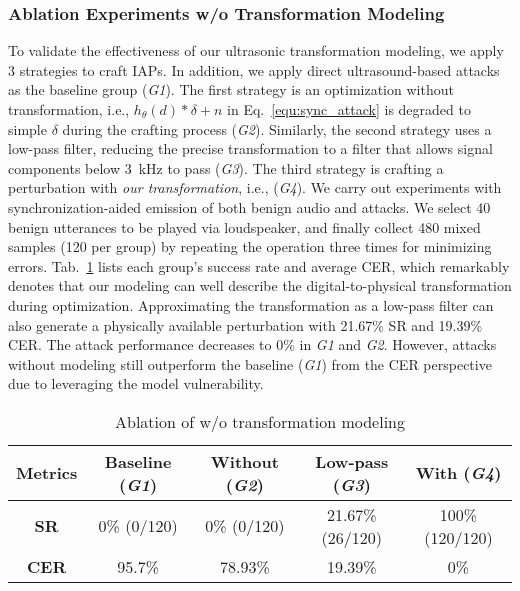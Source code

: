 \subsubsection{Ablation Experiments w/o Transformation Modeling}\label{sec:eval_utm}
To validate the effectiveness of our ultrasonic transformation modeling, we apply 3 strategies to craft IAPs. In addition, we apply direct ultrasound-based attacks as the baseline group (\textit{G1}).
The first strategy is an optimization without transformation, i.e., $h_{\theta}(d)\ast\delta+n$ in Eq.~\ref{equ:sync_attack} is degraded to simple $\delta$ during the crafting process (\textit{G2}). 
Similarly, the second strategy uses a low-pass filter, reducing the precise transformation to a filter that allows signal components below 3~kHz to pass (\textit{G3}).
The third strategy is crafting a perturbation with \emph{our transformation}, i.e., \alias (\textit{G4}). 
We carry out experiments with synchronization-aided emission of both benign audio and attacks. We select 40 benign utterances to be played via loudspeaker, and finally collect 480 mixed samples (120 per group) by repeating the operation three times for minimizing errors. Tab.~\ref{tab:wo_transformation} lists each group's success rate and average CER, which remarkably denotes that our modeling can well describe the digital-to-physical transformation during optimization. Approximating the transformation as a low-pass filter can also generate a physically available perturbation with 21.67\% SR and 19.39\% CER. The attack performance decreases to 0\% in \textit{G1} and \textit{G2}. However, attacks without modeling still outperform the baseline (\textit{G1}) from the CER perspective due to leveraging the model vulnerability.


\begin{table}[t]\footnotesize
	\centering
		\caption{Ablation of w/o transformation modeling}
		\renewcommand\arraystretch{0.7}
		\renewcommand\tabcolsep{2pt}
		\begin{threeparttable}
			\begin{tabular}{c|c|c|c|c}
				\toprule
				\textbf{Metrics} & \textbf{Baseline (\textit{G1})} & \textbf{Without (\textit{G2})} & \textbf{Low-pass (\textit{G3})} & \textbf{With (\textit{G4})} \\
				\midrule
				\textbf{SR} & 0\% (0/120) & 0\% (0/120) & 21.67\% (26/120) & 100\% (120/120) \\ \midrule
				\textbf{CER} & 95.7\% & 78.93\% & 19.39\% & 0\% \\
				\bottomrule
			\end{tabular}
		\end{threeparttable}
		\label{tab:wo_transformation}
\end{table}

